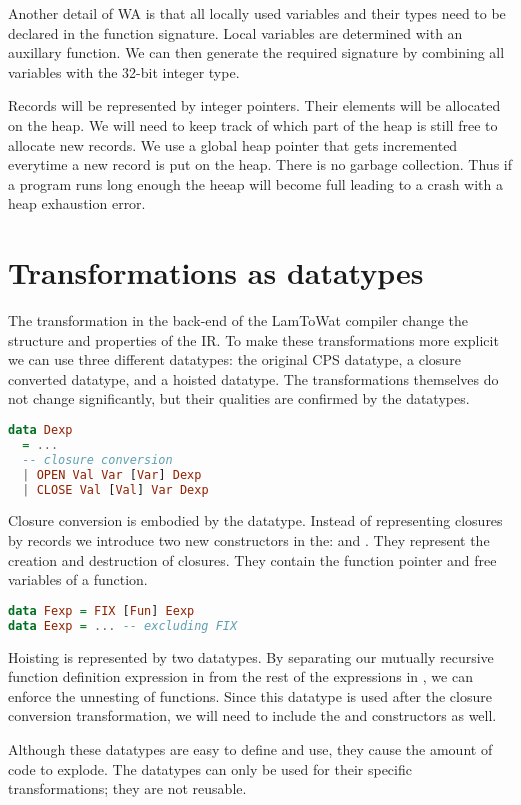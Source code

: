 Another detail of \ac{WA} is that all locally used variables and their types need to be declared in the function signature. Local variables are determined with an auxillary function. We can then generate the required signature by combining all variables with the 32-bit integer type.

Records will be represented by integer pointers. Their elements will be allocated on the heap. We will need to keep track of which part of the heap is still free to allocate new records. We use a global heap pointer that gets incremented everytime a new record is put on the heap. There is no garbage collection. Thus if a program runs long enough the heeap will become full leading to a crash with a heap exhaustion error. 

\section{\label{section:transdata}Transformations as datatypes}
The transformation in the back-end of the LamToWat compiler change the structure and properties of the \ac{IR}. To make these transformations more explicit we can use three different datatypes: the original \ac{CPS} datatype, a closure converted datatype, and a hoisted datatype. The transformations themselves do not change significantly, but their qualities are confirmed by the datatypes.

\begin{lstlisting}[language=Haskell]
data Dexp
  = ...
  -- closure conversion
  | OPEN Val Var [Var] Dexp
  | CLOSE Val [Val] Var Dexp
\end{lstlisting}

Closure conversion is embodied by the  datatype. Instead of representing closures by records we introduce two new constructors in the:  and . They represent the creation and destruction of closures. They contain the function pointer and free variables of a function.

\begin{lstlisting}[language=Haskell]
data Fexp = FIX [Fun] Eexp
data Eexp = ... -- excluding FIX
\end{lstlisting}

Hoisting is represented by two datatypes. By separating our mutually recursive function definition expression in  from the rest of the expressions in , we can enforce the unnesting of functions. Since this datatype is used after the closure conversion transformation, we will need to include the  and  constructors as well.

Although these datatypes are easy to define and use, they cause the amount of code to explode. The datatypes can only be used for their specific transformations; they are not reusable. 
